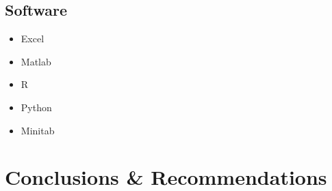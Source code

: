 \documentclass[11pt,a4paper,article]{memoir} %
\begin{document}
\section{Software}
\begin{itemize}
\item Excel
\item Matlab
\item R
\item Python
\item Minitab
\end{itemize}

\chapter{Conclusions \& Recommendations}

\newpage
\appendix
\chapter{}

\end{document}
